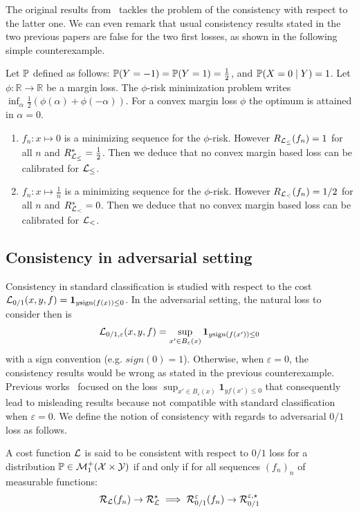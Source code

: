 The original results from~\citep{bartlett2006convexity,steinwart2007compare} tackles the problem of the consistency with respect to the latter one. We can even remark that usual consistency results stated in the two previous papers are false for the two first losses, as shown in the following simple counterexample.

\begin{counterexample*}
Let $\mathbb{P}$ defined as follows: $\mathbb{P}(Y=-1)=\mathbb{P}(Y=1)=\frac12$, and $\mathbb{P}(X=0\mid Y)=1$. Let $\phi:\mathbb{R}\to\mathbb{R}$ be a margin  loss. The $\phi$-risk minimization problem writes $\inf_{\alpha} \frac{1}{2} (\phi(\alpha)+\phi(-\alpha))$. For a convex margin loss $\phi$ the optimum is attained in $\alpha=0$. 
\begin{enumerate}
    \item $f_n:x\mapsto 0$ is a minimizing sequence for the $\phi$-risk. However $R_{\mathcal{L}_{\leq}}(f_n)=1$ for all $n$ and $R_{\mathcal{L}_{\leq}}^*=\frac{1}{2}$. Then we deduce that no convex margin based loss can be calibrated for $\mathcal{L}_{\leq}$.
    \item $f_n:x\mapsto \frac{1}{n}$ is a minimizing sequence for the $\phi$-risk. However $R_{\mathcal{L}_{<}}(f_n)=1/2$ for all $n$ and $R_{\mathcal{L}_{<}}^*=0$. Then we deduce that no convex margin based loss can be calibrated for $\mathcal{L}_{<}$.
\end{enumerate}

\end{counterexample*}



\subsection{Consistency in adversarial setting}


Consistency in standard classification is studied with respect to the cost $\mathcal{L}_{0/1}(x,y,f)=\mathbf{1}_{y\text{sign}(f(x))\leq 0}$. In the adversarial setting, the natural loss to consider then is  $$\mathcal{L}_{0/1,\varepsilon}(x,y,f)=\sup_{x'\in B_\varepsilon(x)}\mathbf{1}_{y\text{sign}(f(x'))\leq 0}$$ 
with a sign convention (e.g. $sign(0)=1$). Otherwise, when $\varepsilon=0$, the consistency results would be wrong as stated in the previous counterexample. Previous works~\citep{pmlr-v125-bao20a,awasthi2021calibration,awasthi2021finer} focused on the loss $\sup_{x'\in B_\varepsilon(x)}\mathbf{1}_{yf(x')\leq 0}$ that consequently lead to misleading results because not compatible with standard classification when $\varepsilon=0$. We define the notion of consistency with regards to adversarial $0/1$ loss as follows.
\begin{definition}
A cost function $\mathcal{L}$ is said to be consistent with respect to $0/1$ loss for a distribution  $\mathbb{P}\in\mathcal{M}_1^+(\mathcal{X}\times\mathcal{Y})$ if and only if for all sequences $(f_n)_n $ of measurable functions:
\begin{align}
    \mathcal{R}_{\mathcal{L}}(f_n)\to \mathcal{R}_{\mathcal{L}}^\star\implies\mathcal{R}_{0/1}^\varepsilon(f_n)\to \mathcal{R}_{0/1}^{\varepsilon,\star}
\end{align}
\end{definition}

